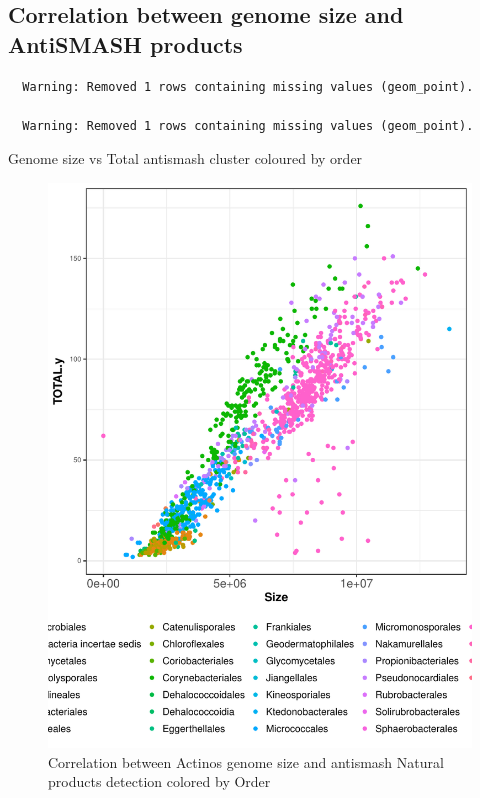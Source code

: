 \documentclass[12pt,twoside]{reedthesis}
\begin{document}
  \subsection{Correlation between genome size and AntiSMASH
  products}\label{correlation-between-genome-size-and-antismash-products-1}
  
  \begin{verbatim}
  Warning: Removed 1 rows containing missing values (geom_point).
  
  Warning: Removed 1 rows containing missing values (geom_point).
  \end{verbatim}
  
  Genome size vs Total antismash cluster coloured by order
  
  \begin{figure}[h!tbp]
  \centering
  \includegraphics[angle = 0,scale = 0.6]{chapter2/Actinobacteria/ActinosSMASHvsSizebyOrder.pdf}
  \caption[Correlation between Actinos genome size and antismash Natural products detection colored by Order]{\normalsize{Correlation between Actinos genome size and antismash Natural products detection colored by Order}}
  \label{fig:ActinosSMASHvsSizebyOrder}
  \end{figure}
  
\end{document}
